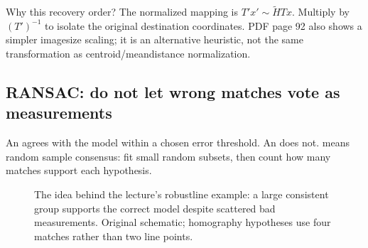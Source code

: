 \documentclass[letterpaper,11pt,english,openany,oneside]{jupyterBook}
\begin{document}
\sphinxAtStartPar
Why this recovery order? The normalized mapping is \(T'x'\sim\widetilde H Tx\). Multiply by \((T')^{-1}\) to isolate the original destination coordinates. PDF page 92 also shows a simpler image\sphinxhyphen{}size scaling; it is an alternative heuristic, not the same transformation as centroid/mean\sphinxhyphen{}distance normalization.


\subsection{RANSAC: do not let wrong matches vote as measurements}
\label{\detokenize{lectures/lecture02/estimation:ransac-do-not-let-wrong-matches-vote-as-measurements}}
\sphinxAtStartPar
An  agrees with the model within a chosen error threshold. An  does not.  means random sample consensus: fit small random subsets, then count how many matches support each hypothesis.

\begin{figure}[H]
\centering
\capstart

\noindent{}
\caption{The idea behind the lecture’s robust\sphinxhyphen{}line example: a large consistent group supports the correct model despite scattered bad measurements. Original schematic; homography hypotheses use four matches rather than two line points.}\label{\detokenize{lectures/lecture02/estimation:fig-lec02-ransac}}\end{figure}
\end{document}
